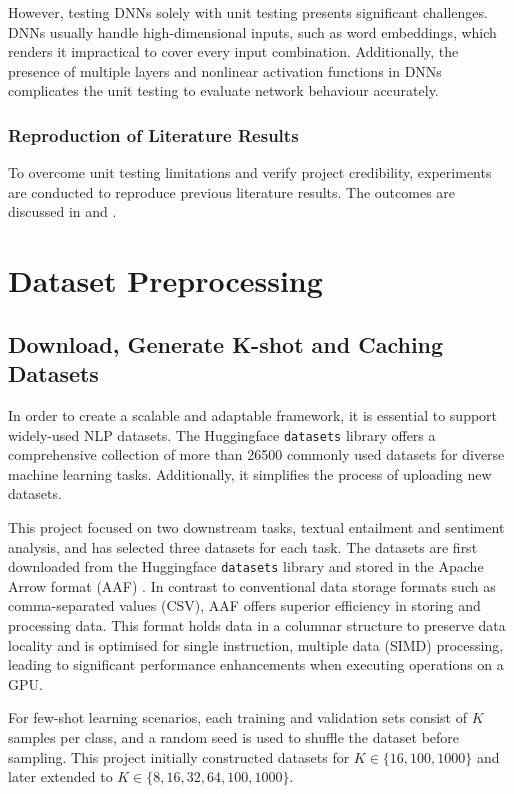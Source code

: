 However, testing DNNs solely with unit testing presents significant challenges. DNNs usually handle high-dimensional inputs, such as word embeddings, which renders it impractical to cover every input combination. Additionally, the presence of multiple layers and nonlinear activation functions in DNNs complicates the unit testing to evaluate network behaviour accurately.

\subsubsection{Reproduction of Literature Results}
To overcome unit testing limitations and verify project credibility, experiments are conducted to reproduce previous literature results. The outcomes are discussed in  and .

\section{Dataset Preprocessing}\label{sec:dataset}
\subsection{Download, Generate K-shot and Caching Datasets} \label{sec:dataset-1}
In order to create a scalable and adaptable framework, it is essential to support widely-used NLP datasets. The Huggingface \texttt{datasets} library offers a comprehensive collection of more than 26500 commonly used datasets for diverse machine learning tasks. Additionally, it simplifies the process of uploading new datasets.

This project focused on two downstream tasks, textual entailment and sentiment analysis, and has selected three datasets for each task. The datasets are first downloaded from the Huggingface \texttt{datasets} library and stored in the Apache Arrow format (AAF) \cite{arrow23}. In contrast to conventional data storage formats such as comma-separated values (CSV), AAF offers superior efficiency in storing and processing data. This format holds data in a columnar structure to preserve data locality and is optimised for single instruction, multiple data (SIMD) processing, leading to significant performance enhancements when executing operations on a GPU. 

For few-shot learning scenarios, each training and validation sets consist of $K$ samples per class, and a random seed is used to shuffle the dataset before sampling. This project initially constructed datasets for $K \in \{16, 100, 1000\}$ and later extended to $K \in \{8, 16, 32, 64, 100, 1000\}$.

